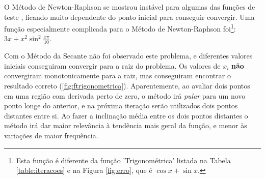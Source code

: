 \documentclass[final,5p]{elsarticle}
\numberwithin{equation}{section}
\begin{document}
    \begin{figure*} 
        \label{fig:erro}
        \centering
        \caption{Evolução do erro do Método da Secante com diferentes funções (linhas tracejadas representam $\varepsilon_{i+1} / \varepsilon_i = 0.5$ e $\varepsilon_{i+1} / \varepsilon_i^2 = 0.5$).}
    \end{figure*}
    
    O Método de Newton-Raphson se mostrou instável para algumas das funções de teste \cite{relatorionewtonraphson}, ficando muito dependente do ponto inicial para conseguir convergir. Uma função especialmente complicada para o Método de Newton-Raphson foi\footnote{Esta função é diferente da função 'Trigonométrica' listada na Tabela \ref{table:iteracoes} e na Figura \ref{fig:erro}, que é $\cos x + \sin x$.}: $3x + x^2 \sin^2 \frac{x\pi}{10}$. 
    
    Com o Método da Secante não foi observado este problema, e diferentes valores iniciais conseguiram convergir para a raiz do problema. Os valores de $x_i$ \textbf{não} convergiram monotonicamente para a raiz, mas conseguiram encontrar o resultado correto (\ref{fig:ftrigonometrica}). Aparentemente, ao avaliar dois pontos em uma região com derivada perto de zero, o método irá \emph{pular} para um novo ponto longe do anterior, e na próxima iteração serão utilizados dois pontos distantes entre si. Ao fazer a inclinação média entre os dois pontos distantes o método irá dar maior relevância à tendência mais geral da função, e menor às variações de maior frequência. 
\end{document}
